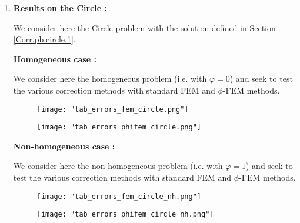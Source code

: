 \begin{enumerate}[label=\textbullet]
	\item \textbf{Results on the Circle :}
	
	We consider here the Circle problem with the solution defined in Section \ref{Corr.pb.circle.1}.
	
	\textbf{Homogeneous case :}
	
	We consider here the homogeneous problem (i.e. with $\varphi=0$) and seek to test the various correction methods with standard FEM and $\phi$-FEM methods.
	
	\begin{minipage}{0.48\linewidth}
		\begin{figure}[H]
			\centering
			\texttt{[image: "tab\_errors\_fem\_circle.png"]}
			\label{tab_errors_fem_circle}
		\end{figure} 
	\end{minipage}
	\begin{minipage}{0.48\linewidth} \qquad 
		\begin{figure}[H]
			\centering
			\texttt{[image: "tab\_errors\_phifem\_circle.png"]}
			\label{tab_errors_phifem_circle}
		\end{figure} 
	\end{minipage}
	
	\textbf{Non-homogeneous case :}
	
	We consider here the non-homogeneous problem (i.e. with $\varphi=1$) and seek to test the various correction methods with standard FEM and $\phi$-FEM methods.
	
	\begin{minipage}{0.48\linewidth}
		\begin{figure}[H]
			\centering
			\texttt{[image: "tab\_errors\_fem\_circle\_nh.png"]}
			\label{tab_errors_fem_circle_nh}
		\end{figure} 
	\end{minipage}
	\begin{minipage}{0.48\linewidth} \qquad 
		\begin{figure}[H]
			\centering
			\texttt{[image: "tab\_errors\_phifem\_circle\_nh.png"]}
			\label{tab_errors_phifem_circle_nh}
		\end{figure} 
	\end{minipage}
	

\end{enumerate}
